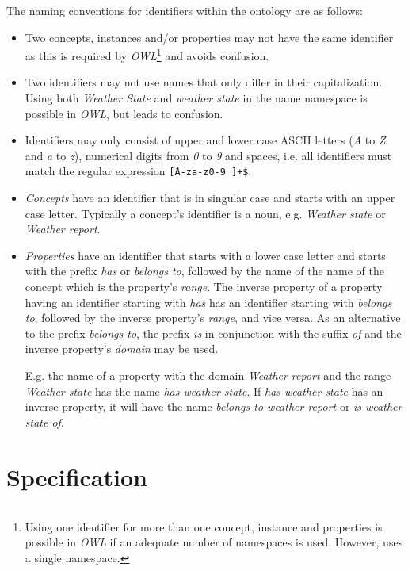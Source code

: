 The naming conventions for identifiers within the ontology are as follows:
\begin{itemize}
  \item Two concepts, instances and/or properties may not have the same identifier as this is required by \emph{OWL}\cite{OWL}\footnote{Using one identifier for more than one concept, instance and properties is possible in \emph{OWL} if an adequate number of namespaces is used. However, \thinkhomeweather uses a single namespace.} and avoids confusion.
  \item Two identifiers may not use names that only differ in their capitalization. Using both \emph{Weather State} and \emph{weather state} in the name namespace is possible in \emph{OWL}, but leads to confusion.
  \item Identifiers may only consist of upper and lower case ASCII letters (\emph{A} to \emph{Z} and \emph{a} to \emph{z}), numerical digits from \emph{0} to \emph{9} and spaces, i.e. all identifiers must match the regular expression \texttt{\^[A-za-z0-9~]+\$}.
  \item \emph{Concepts} have an identifier that is in singular case and starts with an upper case letter. Typically a concept's identifier is a noun, e.g. \emph{Weather state} or \emph{Weather report}.
  \item \emph{Properties} have an identifier that starts with a lower case letter and starts with the prefix \emph{has} or \emph{belongs to}, followed by the name of the name of the concept which is the property's \emph{range}. The inverse property of a property having an identifier starting with \emph{has} has an identifier starting with \emph{belongs to}, followed by the inverse property's \emph{range}, and vice versa. As an alternative to the prefix \emph{belongs to}, the prefix \emph{is} in conjunction with the suffix \emph{of} and the inverse property's \emph{domain} may be used.
  
  E.g. the name of a property with the domain \emph{Weather report} and the range \emph{Weather state} has the name \emph{has weather state}. If \emph{has weather state} has an inverse property, it will have the name \emph{belongs to weather report} or \emph{is weather state of}.
\end{itemize}


\section{Specification}
\label{sec:ontology_specification}

